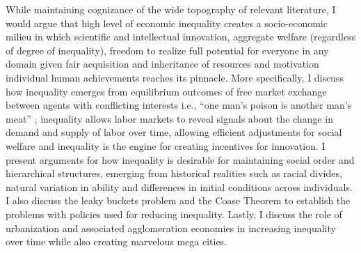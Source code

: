 \documentclass[12pt]{article}
\newcommand{\1}{\mathbbm 1}
\begin{document}
While maintaining cognizance of the wide topography of relevant literature, I would argue that high level of economic inequality creates a socio-economic milieu in which scientific and intellectual innovation, aggregate welfare (regardless of degree of inequality), freedom to realize full potential for everyone in any domain given fair acquisition and inheritance of resources and motivation individual human achievements reaches its pinnacle. More specifically, I discuss how inequality emerges from equilibrium outcomes of free market exchange between agents with conflicting interests i.e., ``one man's poison is another man's meat'' \cite{friedman1976fragility}, inequality allows labor markets to reveal signals about the change in demand and supply of labor over time, allowing efficient adjustments for social welfare and inequality is the engine for creating incentives for innovation. I present arguments for how inequality is desirable for maintaining social order and hierarchical structures, emerging from historical realities such as racial divides, natural variation in ability and differences in initial conditions across individuals. I also discuss the leaky buckets problem and the Coase Theorem to establish the problems with policies used for reducing inequality.  Lastly, I discuss the role of urbanization and associated agglomeration economies in increasing inequality over time while also creating marvelous mega cities.








	
	
	
	
	

	
	
	
	
	
	 
\end{document}

